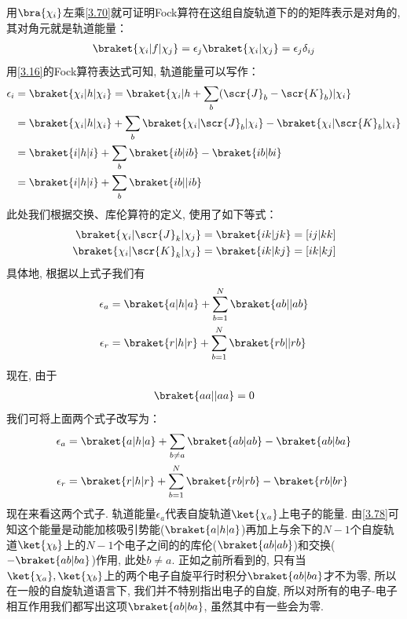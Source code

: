 用$\bra{\chi_i}$左乘\autoref{3.70}就可证明Fock算符在这组自旋轨道下的的矩阵表示是对角的, 
其对角元就是轨道能量：
\begin{align}
	\braket{\chi_i|f|\chi_j} = \epsilon_j\braket{\chi_i|\chi_j} = \epsilon_j\delta_{ij}
\end{align}
用\autoref{3.16}的Fock算符表达式可知, 
轨道能量可以写作：
\begin{align}
	\epsilon_i & = \braket{\chi_i|h|\chi_i} = \braket{\chi_i|h+\sum_b(\scr{J}_b-\scr{K}_b)|\chi_i}\notag\\
	& = \braket{\chi_i|h|\chi_i} + \sum_b\braket{\chi_i|\scr{J}_b|\chi_i} - \braket{\chi_i|\scr{K}_b|\chi_i}\notag\\
	& = \braket{i|h|i} + \sum_b\braket{ib|ib} - \braket{ib|bi}\notag\\
	& = \braket{i|h|i} + \sum_b\braket{ib||ib}
	\label{3.72}
\end{align}
此处我们根据交换、库伦算符的定义, 
使用了如下等式：
\begin{align}
	\braket{\chi_i|\scr{J}_k|\chi_j} & = \braket{ik|jk} = [ij|kk]\\
	\braket{\chi_i|\scr{K}_k|\chi_j} & = \braket{ik|kj} = [ik|kj]
\end{align}
具体地, 
根据以上式子我们有
\begin{align}
	\label{3.75}
	\epsilon_a & = \braket{a|h|a} + \sum_{b=1}^{N}\braket{ab||ab}\\
	\epsilon_r & = \braket{r|h|r} + \sum_{b=1}^{N}\braket{rb||rb}
	\label{3.76}
\end{align}
现在, 
由于
\begin{align}
	\braket{aa||aa} = 0
\end{align}
我们可将上面两个式子改写为：
\begin{align}
	\label{3.78}
	\epsilon_a & = \braket{a|h|a} + \sum_{b\neq a}\braket{ab|ab} - \braket{ab|ba}\\
	\epsilon_r & = \braket{r|h|r} + \sum_{b=1}^{N}\braket{rb|rb} - \braket{rb|br}
	\label{3.79}
\end{align}
现在来看这两个式子. 
轨道能量$\epsilon_a$代表自旋轨道$\ket{\chi_a}$上电子的能量. 
由\autoref{3.78}可知这个能量是动能加核吸引势能($\braket{a|h|a}$)再加上与余下的$N-1$个自旋轨道$\ket{\chi_b}$上的$N-1$个电子之间的的库伦($\braket{ab|ab}$)和交换($-\braket{ab|ba}$)作用, 
此处$b \neq a$. 
正如之前所看到的, 
只有当$\ket{\chi_a},\ket{\chi_b}$上的两个电子自旋平行时积分$\braket{ab|ba}$才不为零, 
所以在一般的自旋轨道语言下, 
我们并不特别指出电子的自旋, 
所以对所有的电子-电子相互作用我们都写出这项$\braket{ab|ba}$, 
虽然其中有一些会为零.


